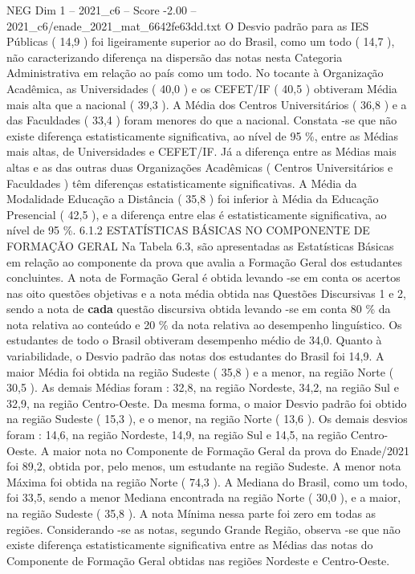 \begin{textsample}{NEG Dim 1 – 2021\_c6 – Score -2.00 – 2021\_c6/enade\_2021\_mat\_6642fe63dd.txt}
O Desvio padrão para as IES Públicas ( 14,9 ) foi ligeiramente superior ao do Brasil, como um todo ( 14,7 ), não caracterizando diferença na dispersão das notas nesta Categoria Administrativa em relação ao país como um todo.
No tocante à Organização Acadêmica, as Universidades ( 40,0 ) e os CEFET/IF ( 40,5 ) obtiveram Média mais alta que a nacional ( 39,3 ).
A Média dos Centros Universitários ( 36,8 ) e a das Faculdades ( 33,4 ) foram menores do que a nacional.
Constata -se que não existe diferença estatisticamente significativa, ao nível de 95 \%, entre as Médias mais altas, de Universidades e CEFET/IF.
Já a diferença entre as Médias mais altas e as das outras duas Organizações Acadêmicas ( Centros Universitários e Faculdades ) têm diferenças estatisticamente significativas.
A Média da Modalidade Educação a Distância ( 35,8 ) foi inferior à Média da Educação Presencial ( 42,5 ), e a diferença entre elas é estatisticamente significativa, ao nível de 95 \%. 6.1.2 ESTATÍSTICAS BÁSICAS NO COMPONENTE DE FORMAÇÃO GERAL Na Tabela 6.3, são apresentadas as Estatísticas Básicas em relação ao componente da prova que avalia a Formação Geral dos estudantes concluintes.
A nota de Formação Geral é obtida levando -se em conta os acertos nas oito questões objetivas e a nota média obtida nas Questões Discursivas 1 e 2, sendo a nota de \textbf{cada} questão discursiva obtida levando -se em conta 80 \% da nota relativa ao conteúdo e 20 \% da nota relativa ao desempenho linguístico.
Os estudantes de todo o Brasil obtiveram desempenho médio de 34,0.
Quanto à variabilidade, o Desvio padrão das notas dos estudantes do Brasil foi 14,9.
A maior Média foi obtida na região Sudeste ( 35,8 ) e a menor, na região Norte ( 30,5 ).
As demais Médias foram : 32,8, na região Nordeste, 34,2, na região Sul e 32,9, na região Centro-Oeste.
Da mesma forma, o maior Desvio padrão foi obtido na região Sudeste ( 15,3 ), e o menor, na região Norte ( 13,6 ).
Os demais desvios foram : 14,6, na região Nordeste, 14,9, na região Sul e 14,5, na região Centro-Oeste.
A maior nota no Componente de Formação Geral da prova do Enade/2021 foi 89,2, obtida por, pelo menos, um estudante na região Sudeste.
A menor nota Máxima foi obtida na região Norte ( 74,3 ).
A Mediana do Brasil, como um todo, foi 33,5, sendo a menor Mediana encontrada na região Norte ( 30,0 ), e a maior, na região Sudeste ( 35,8 ).
A nota Mínima nessa parte foi zero em todas as regiões.
Considerando -se as notas, segundo Grande Região, observa -se que não existe diferença estatisticamente significativa entre as Médias das notas do Componente de Formação Geral obtidas nas regiões Nordeste e Centro-Oeste.

\end{textsample}
